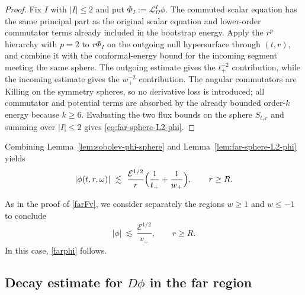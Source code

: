 \documentclass[11pt]{article}
\numberwithin{equation}{section}
\theoremstyle{plain}
\theoremstyle{definition}
\theoremstyle{remark}
\begin{document}
\begin{proof}
Fix $I$ with $|I|\le2$ and put $\Phi_I:=\mathcal L_\Omega^I\phi$.  The commuted scalar equation has the same principal part as the original scalar equation and lower-order commutator terms already included in the bootstrap energy.  Apply the $r^p$ hierarchy with $p=2$ to $r\Phi_I$ on the outgoing null hypersurface through $(t,r)$, and combine it with the conformal-energy bound for the incoming segment meeting the same sphere.  The outgoing estimate gives the $t_+^{-2}$ contribution, while the incoming estimate gives the $w_+^{-2}$ contribution.  The angular commutators are Killing on the symmetry spheres, so no derivative loss is introduced; all commutator and potential terms are absorbed by the already bounded order-$k$ energy because $k\ge6$.  Evaluating the two flux bounds on the sphere $S_{t,r}$ and summing over $|I|\le2$ gives \eqref{eq:far-sphere-L2-phi}.
\end{proof}

Combining Lemma~\ref{lem:sobolev-phi-sphere} and Lemma~\ref{lem:far-sphere-L2-phi} yields
\begin{equation}\label{scalarineq2}
|\phi(t,r,\omega)|
\ \lesssim\ \frac{\mathcal E^{1/2}}{r}\Bigl(\frac{1}{t_{+}}+\frac{1}{w_{+}}\Bigr),
\qquad r\ge R.
\end{equation}

As in the proof of \eqref{farFv}, we consider separately the regions $w\ge 1$ and $w\le -1$ to conclude
\begin{equation}\label{scalarregion}
|\phi|\ \lesssim\ \frac{\mathcal E^{1/2}}{v_{+}},
\qquad r\ge R.
\end{equation}
In this case, \eqref{farphi} follows.
\subsection{Decay estimate for \texorpdfstring{$D\phi$}{} in the far region}\label{subsec:far-decay-Dphi}
\end{document}
